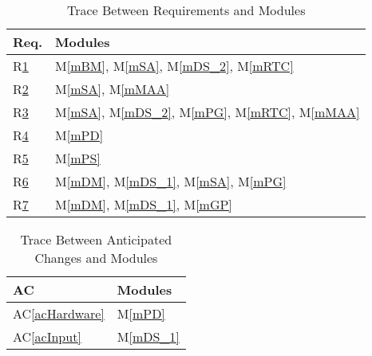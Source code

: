 \documentclass[12pt, titlepage]{article}
\newcommand{\acref}[1]{AC\ref{#1}}
\newcommand{\mref}[1]{M\ref{#1}}
\begin{document}
\begin{table}[H]
  \centering
  \begin{tabular}{p{} p{}}
    \toprule
    \textbf{Req.} & \textbf{Modules}                                                                           \\
    \midrule
    R\href{https://github.com/zakerl/Capstone_Project/blob/main/docs/SRS/SRS.pdf}{1}            & \mref{mBM}, \mref{mSA}, \mref{mDS_2}, \mref{mRTC}                               \\
    R\href{https://github.com/zakerl/Capstone_Project/blob/main/docs/SRS/SRS.pdf}{2}            & \mref{mSA}, \mref{mMAA}                                                              \\
    R\href{https://github.com/zakerl/Capstone_Project/blob/main/docs/SRS/SRS.pdf}{3}            & \mref{mSA}, \mref{mDS_2}, \mref{mPG}, \mref{mRTC}, \mref{mMAA}                                                                             \\
    R\href{https://github.com/zakerl/Capstone_Project/blob/main/docs/SRS/SRS.pdf}{4}            & \mref{mPD}                                                    \\
    R\href{https://github.com/zakerl/Capstone_Project/blob/main/docs/SRS/SRS.pdf}{5}            & \mref{mPS} \\
    R\href{https://github.com/zakerl/Capstone_Project/blob/main/docs/SRS/SRS.pdf}{6}            & \mref{mDM}, \mref{mDS_1}, \mref{mSA}, \mref{mPG}\\
    R\href{https://github.com/zakerl/Capstone_Project/blob/main/docs/SRS/SRS.pdf}{7}           & \mref{mDM}, \mref{mDS_1}, \mref{mGP}             \\
    \bottomrule
  \end{tabular}
  \caption{Trace Between Requirements and Modules}
  \label{TblRT}
\end{table}

\begin{table}[H]
  \centering
  \begin{tabular}{p{} p{}}
    \toprule
    \textbf{AC}         & \textbf{Modules}  \\
    \midrule
    \acref{acHardware}  & \mref{mPD}        \\
    \acref{acInput}     & \mref{mDS_1}     \\
    \bottomrule
  \end{tabular}
  \caption{Trace Between Anticipated Changes and Modules}
  \label{TblACT}
\end{table}
\end{document}

